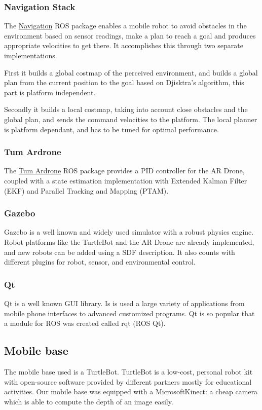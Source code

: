 \documentclass[11pt,a4paper]{article}
\begin{document}
\subsubsection{Navigation Stack}
The \href{http://wiki.ros.org/navigation}{Navigation} ROS package enables a mobile robot to avoid obstacles in the environment based on sensor readings, make a plan to reach a goal and produces appropriate velocities to get there. It accomplishes this through two separate implementations. 

First it builds a global costmap of the perceived environment, and builds a global plan from the current position to the goal based on Djisktra's algorithm, this part is platform independent. 

Secondly it builds a local costmap, taking into account close obstacles and the global plan, and sends the command velocities to the platform. The local planner is  platform dependant, and has to be tuned for optimal performance.

\subsubsection{Tum Ardrone}
The \href{http://wiki.ros.org/tum_ardrone}{Tum Ardrone} ROS package provides a PID controller for the AR Drone, coupled with a state estimation implementation with Extended Kalman Filter (EKF) and Parallel Tracking and Mapping (PTAM).

\subsubsection{Gazebo}
Gazebo is a well known and widely used simulator with a robust physics engine. 
Robot platforms like the TurtleBot and the AR Drone are already implemented, and new robots can be added using a SDF description. It also counts with different plugins  for robot, sensor, and environmental control. 

\subsubsection{Qt}
Qt is a well known GUI library. Is is used a large variety of applications from mobile phone interfaces to advanced customized programs. Qt is so popular that a module for ROS was
created called rqt (ROS Qt).


\subsection{Mobile base}
The mobile base used is a TurtleBot. TurtleBot is a low-cost, personal robot kit with open-source software provided by different partners mostly for educational activities.
Our mobile base was equipped with a Microsoft\textcopyright Kinect\texttrademark : a cheap camera which is able to compute the depth of an image easily.
\end{document}
